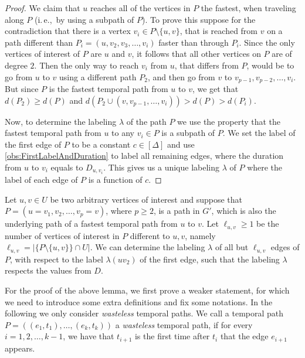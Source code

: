 \documentclass[a4paper,UKenglish,cleveref, autoref, thm-restate]{lipics-v2021}
\newcommand{\ie}{i.\,e.,\ }
\begin{document}
\begin{proof}
We claim that $u$ reaches all of the vertices in $P$ the fastest, when traveling along $P$ (\ie by using a subpath of $P$).
To prove this suppose for the contradiction that there is a vertex $v_i \in P \setminus \{u,v\}$, that is reached from $v$ on a path different than $P_i = (u, v_2, v_3, \dots, v_i)$ faster than through $P_i$.
Since the only vertices of interest of $P$ are $u$ and $v$, it follows that all other vertices on $P$ are of degree $2$. 
Then the only way to reach $v_i$ from $u$, that differs from $P$, would be to go from $u$ to $v$ using a different path $P_2$,
and then go from $v$ to $v_{p-1}, v_{p-2}, \dots, v_i$.
But since $P$ is the fastest temporal path from $u$ to $v$, we get that $d(P_2) \geq d(P)$ and $d(P_2 \cup (v,v_{p-1}, \dots, v_i)) > d(P) > d(P_i)$.

Now, to determine the labeling $\lambda$ of the path $P$ we use the property that the fastest temporal path from $u$ to any $v_i \in P$ is a subpath of $P$. 
We set the label of the first edge of $P$ to be a constant $c\in [\Delta]$
and
use \cref{obs:FirstLabelAndDuration} to label all remaining edges,
where the duration from $u$ to $v_i$ equals to $D_{u,v_i}$.
This gives us a unique labeling $\lambda$ of $P$ where the label of each edge of $P$ is a function of $c$.
\end{proof}

\begin{lemma}\label{lemma:FPT-uv-LabelAlmostalledges}
    Let $u, v \in U$ be two arbitrary vertices of interest and suppose that $P = (u=v_1, v_2, \dots, v_p = v)$, where $p \geq 2$, 
    is a path in $G'$, which is also the underlying path of a fastest temporal path from $u$ to $v$.
    Let $\ell_{u,v} \geq 1$ be the number of vertices of interest in $P$ different to $u,v$, namely $\ell_{u,v} = |\{P \setminus \{u,v \} \} \cap U |$.
    We can determine the labeling $\lambda$ of all but $\ell_{u,v}$ edges of $P$, with respect to the label $\lambda(uv_2)$ of the first edge,
    such that the labeling $\lambda$ respects the values from $D$.
\end{lemma}

For the proof of the above lemma, we first prove a weaker statement,
for which we need to introduce some extra definitions and fix some notations.
%
In the following
we only consider \emph{wasteless} temporal paths. 
We call 
a temporal path $P=((e_{1},t_{1}),\ldots ,(e_{k},t_{k}))$ a \emph{wasteless} temporal path, 
if for every $i=1,2,\ldots ,k-1$, we have that $t_{i+1}$ is the first time after $t_{i}$ that the edge $e_{i+1}$ appears. 
\end{document}
